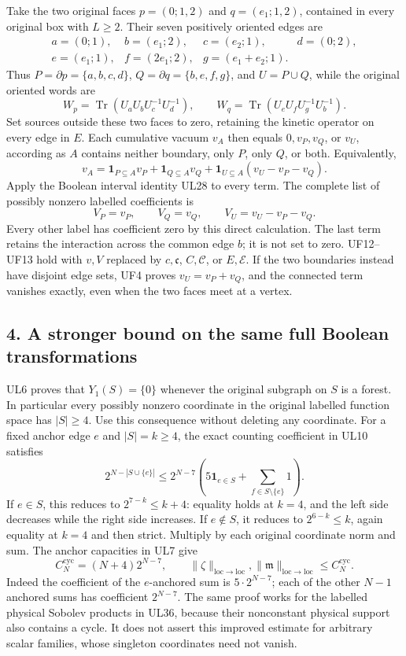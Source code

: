 \documentclass[11pt]{article}
\begin{document}
Take the two original faces \(p=(0;1,2)\) and \(q=(e_1;1,2)\), contained in every original box with \(L\ge2\). Their seven positively oriented edges are
\[
\begin{array}{llll}
a=(0;1),&b=(e_1;2),&c=(e_2;1),&d=(0;2),\\
e=(e_1;1),&f=(2e_1;2),&g=(e_1+e_2;1).
\end{array}
\tag{UF10}
\]
Thus \(P=\partial p=\{a,b,c,d\}\), \(Q=\partial q=\{b,e,f,g\}\), and \(U=P\cup Q\), while the original oriented words are
\[
W_p=\operatorname{Tr}(U_aU_bU_c^{-1}U_d^{-1}),\qquad
W_q=\operatorname{Tr}(U_eU_fU_g^{-1}U_b^{-1}).
\tag{UF11}
\]
Set sources outside these two faces to zero, retaining the kinetic operator on every edge in \(E\). Each cumulative vacuum \(v_A\) then equals \(0,v_P,v_Q\), or \(v_U\), according as \(A\) contains neither boundary, only \(P\), only \(Q\), or both. Equivalently,
\[
v_A=\mathbf1_{P\subseteq A}v_P+\mathbf1_{Q\subseteq A}v_Q
 +\mathbf1_{U\subseteq A}(v_U-v_P-v_Q).
\tag{UF12}
\]
Apply the Boolean interval identity UL28 to every term. The complete list of possibly nonzero labelled coefficients is
\[
\boxed{V_P=v_P,\qquad V_Q=v_Q,\qquad V_U=v_U-v_P-v_Q.}
\tag{UF13}
\]
Every other label has coefficient zero by this direct calculation. The last term retains the interaction across the common edge \(b\); it is not set to zero. UF12–UF13 hold with \(v,V\) replaced by \(c,\mathfrak c\), \(C,\mathcal C\), or \(E,\mathcal E\). If the two boundaries instead have disjoint edge sets, UF4 proves \(v_U=v_P+v_Q\), and the connected term vanishes exactly, even when the two faces meet at a vertex.

\subsection*{4. A stronger bound on the same full Boolean transformations}

UL6 proves that \(Y_1(S)=\{0\}\) whenever the original subgraph on \(S\) is a forest. In particular every possibly nonzero coordinate in the original labelled function space has \(|S|\ge4\). Use this consequence without deleting any coordinate. For a fixed anchor edge \(e\) and \(|S|=k\ge4\), the exact counting coefficient in UL10 satisfies
\[
2^{N-|S\cup\{e\}|}
\le2^{N-7}\left(5\mathbf1_{e\in S}
                      +\sum_{f\in S\setminus\{e\}}1\right).
\tag{UF14}
\]
If \(e\in S\), this reduces to \(2^{7-k}\le k+4\): equality holds at \(k=4\), and the left side decreases while the right side increases. If \(e\notin S\), it reduces to \(2^{6-k}\le k\), again equality at \(k=4\) and then strict. Multiply by each original coordinate norm and sum. The anchor capacities in UL7 give
\[
C_N^{\mathrm{cyc}}=(N+4)2^{N-7},\qquad
\boxed{\|\zeta\|_{\mathrm{loc}\to\mathrm{loc}},
       \|\mathfrak m\|_{\mathrm{loc}\to\mathrm{loc}}
       \le C_N^{\mathrm{cyc}}.}
\tag{UF15}
\]
Indeed the coefficient of the \(e\)-anchored sum is \(5\cdot2^{N-7}\); each of the other \(N-1\) anchored sums has coefficient \(2^{N-7}\). The same proof works for the labelled physical Sobolev products in UL36, because their nonconstant physical support also contains a cycle. It does not assert this improved estimate for arbitrary scalar families, whose singleton coordinates need not vanish.
\end{document}
